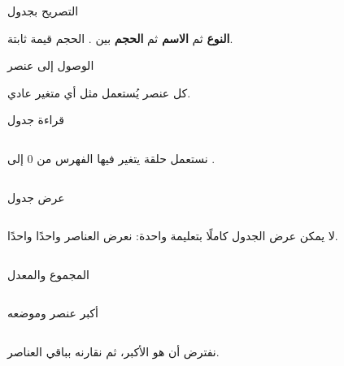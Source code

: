 \documentclass[aspectratio=169, 11pt, t, xcolor={table}]{beamer}
\begin{document}
\begin{frame}{التصريح بجدول}
    \begin{center}
    \begin{minipage}{0.7\textwidth}
    \end{minipage}
    \end{center}
    \vspace{0.3cm}
    \textbf{النوع} ثم \textbf{الاسم} ثم \textbf{الحجم} بين \code{[ ]}. الحجم قيمة ثابتة.
\end{frame}

\begin{frame}{الوصول إلى عنصر}
    \begin{center}
    \begin{minipage}{0.62\textwidth}
    \end{minipage}
    \end{center}
    \vspace{0.3cm}
    كل عنصر  يُستعمل مثل أي متغير عادي.
\end{frame}

\begin{frame}{قراءة جدول}
    \begin{columns}[T]
        نستعمل حلقة  يتغير فيها الفهرس  من \textenglish{0} إلى .
    \end{columns}
\end{frame}

\begin{frame}{عرض جدول}
    \begin{columns}[T]
        لا يمكن عرض الجدول كاملًا بتعليمة واحدة: نعرض العناصر واحدًا واحدًا.
    \end{columns}
\end{frame}

\begin{frame}{المجموع والمعدل}
    \begin{columns}[T]
    \end{columns}
\end{frame}

\begin{frame}{أكبر عنصر وموضعه}
    \begin{columns}[T]
    \end{columns}
    \vspace{0.2cm}
    نفترض أن  هو الأكبر، ثم نقارنه بباقي العناصر.
\end{frame}
\end{document}
